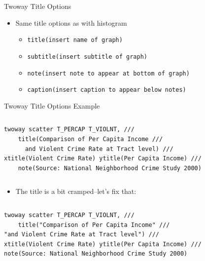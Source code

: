 \documentclass[table,smaller]{beamer}
\begin{document}
\begin{frame}[fragile,label=sec-3-3]{Twoway Title Options}
 \begin{itemize}
\item Same title options as with histogram
\begin{itemize}
\item \texttt{title(insert name of graph)}
\item \texttt{subtitle(insert subtitle of graph)}
\item \texttt{note(insert note to appear at bottom of graph)}
\item \texttt{caption(insert caption to appear below notes)}
\end{itemize}
\end{itemize}
\end{frame}
\begin{frame}[fragile,label=sec-3-4]{Twoway Title Options Example}
 \vspace{-.5em} \begin{columns}  \begin{block}{}
\begin{verbatim}
twoway scatter T_PERCAP T_VIOLNT, ///
    title(Comparison of Per Capita Income ///
	  and Violent Crime Rate at Tract level) ///
xtitle(Violent Crime Rate) ytitle(Per Capita Income) ///
    note(Source: National Neighborhood Crime Study 2000)
\end{verbatim}

\end{block} \end{columns}

\begin{itemize}
\item The title is a bit cramped--let's fix that:
\end{itemize}

\vspace{-.5em} \begin{columns}  \begin{block}{}
\begin{verbatim}
twoway scatter T_PERCAP T_VIOLNT, ///
    title("Comparison of Per Capita Income" ///
"and Violent Crime Rate at Tract level") ///
xtitle(Violent Crime Rate) ytitle(Per Capita Income) ///
note(Source: National Neighborhood Crime Study 2000)
\end{verbatim}

\end{block} \end{columns}
\end{frame}
\end{document}
